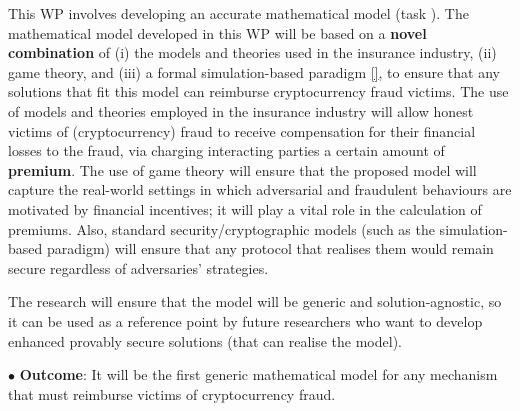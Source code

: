  
 
\vs
\noindent{}
%


\vs
 
This WP involves developing an accurate mathematical model (task \1). The mathematical model developed in this WP will be based on a \textbf{novel combination} of (i) the models and theories used in the insurance industry, (ii) game theory, and (iii) a formal simulation-based paradigm \href{https://link.springer.com/chapter/10.1007/978-3-319-57048-8_6}{[\printcntr]}, to ensure that any solutions that fit this model can reimburse cryptocurrency fraud victims. The use of models and theories employed in the insurance industry will allow honest victims of (cryptocurrency) fraud to receive compensation for their financial losses to the fraud, via charging interacting parties a certain amount of \textbf{premium}. The use of game theory will ensure that the proposed model will capture the real-world settings in which adversarial and fraudulent behaviours are motivated by financial incentives; it will play a vital role in the calculation of premiums. Also, standard security/cryptographic models (such as the simulation-based paradigm) will ensure that any protocol that realises them would remain secure regardless of adversaries’ strategies. 

The research will ensure that the model will be generic and solution-agnostic, so it can be used as a reference point by future researchers who want to develop enhanced provably secure solutions (that can realise the model).  

 \noindent$\bullet$\textbf{ Outcome}: It will be the first generic mathematical model for any mechanism that must reimburse victims of cryptocurrency fraud. 
 
 
 
 
 



